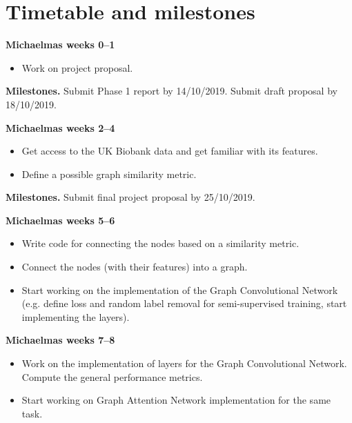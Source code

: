 \documentclass[12pt,a4paper,twoside]{article}
\begin{document}
\section*{Timetable and milestones}
\label{section:timetable}



\textbf{Michaelmas weeks 0–1}
\begin{itemize}
  \item Work on project proposal.
\end{itemize}

\textbf{Milestones.} Submit Phase 1 report by 14/10/2019. Submit draft proposal by 18/10/2019.

\textbf{Michaelmas weeks 2–4}
\begin{itemize}
  \item Get access to the UK Biobank data and get familiar with its features.
  \item Define a possible graph similarity metric.
\end{itemize}

\textbf{Milestones.} Submit final project proposal by 25/10/2019.

\textbf{Michaelmas weeks 5–6}
\begin{itemize}
  \item Write code for connecting the nodes based on a similarity metric.
  \item Connect the nodes (with their features) into a graph.
  \item Start working on the implementation of the Graph Convolutional Network (e.g. define loss and random label removal for semi-supervised training, start implementing the layers).
\end{itemize}

\textbf{Michaelmas weeks 7–8} 
\begin{itemize}
  \item Work on the implementation of layers for the Graph Convolutional Network. Compute the general performance metrics.
  \item Start working on Graph Attention Network implementation for the same task.
\end{itemize}
\end{document}
